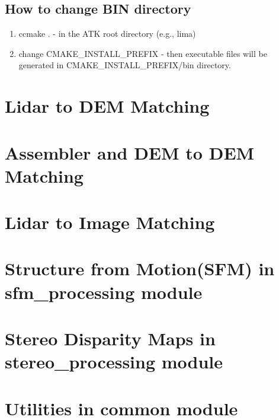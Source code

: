 \documentclass[12pt]{article}
\begin{document}
\subsection{How to change BIN directory}\label{sec:How to change BIN directory}

\begin{enumerate}
	\item{ccmake .} - in the ATK root directory (e.g., lima)
	\item{change CMAKE\_INSTALL\_PREFIX} - then executable files will be generated in CMAKE\_INSTALL\_PREFIX/bin directory.
\end{enumerate}


\newpage
\section{Lidar  to DEM Matching }
\label{sec:lidar2dem}

\newpage
\section{Assembler and DEM to DEM Matching }
\label{sec:dem2dem}

\newpage
\section{Lidar to Image Matching }
\label{sec:lidar2img}

\newpage
\section{Structure from Motion(SFM) in sfm\_processing module}
\label{sec:sfm}

\newpage
\section{Stereo Disparity Maps in stereo\_processing module}
\label{sec:stereo}

\newpage
\section{Utilities in common module}
\label{sec:common}

\end{document}
